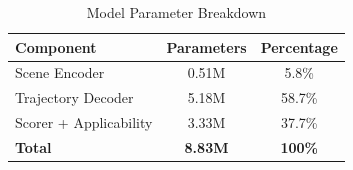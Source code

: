 \begin{table}[t]
\centering
\caption{Model Parameter Breakdown}
\label{tab:param_breakdown}
\begin{tabular}{lcc}
\toprule
\textbf{Component} & \textbf{Parameters} & \textbf{Percentage} \\
\midrule
Scene Encoder & 0.51M & 5.8\% \\
Trajectory Decoder & 5.18M & 58.7\% \\
Scorer + Applicability & 3.33M & 37.7\% \\
\midrule
\textbf{Total} & \textbf{8.83M} & \textbf{100\%} \\
\bottomrule
\end{tabular}
\end{table}
